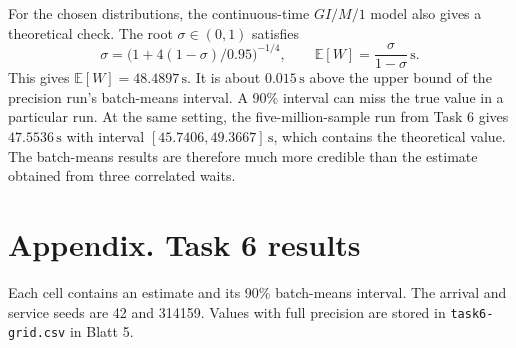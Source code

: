 \documentclass[11pt,a4paper]{article}
\newcommand{\E}{\mathbb{E}}
\newcommand{\unitsec}{\,\mathrm{s}}
\begin{document}
For the chosen distributions, the continuous-time \(GI/M/1\) model
also gives a theoretical check. The root \(\sigma\in(0,1)\) satisfies
\[
 \sigma=\bigl(1+4(1-\sigma)/0.95\bigr)^{-1/4},
 \qquad \E[W]=\frac{\sigma}{1-\sigma}\unitsec.
\]
This gives \(\E[W]=48.4897\unitsec\). It is about \(0.015\unitsec\)
above the upper bound of the precision run's batch-means interval.
A 90\% interval can miss the true value in a particular run. At the
same setting, the five-million-sample run from Task 6 gives
\(47.5536\unitsec\) with interval
\([45.7406,49.3667]\unitsec\), which contains the theoretical value.
The batch-means results are therefore much more credible than the
estimate obtained from three correlated waits.

\clearpage
\section*{Appendix. Task 6 results}

Each cell contains an estimate and its 90\% batch-means interval.
The arrival and service seeds are 42 and 314159. Values with full
precision are stored in \texttt{task6-grid.csv} in Blatt 5.


\end{document}
